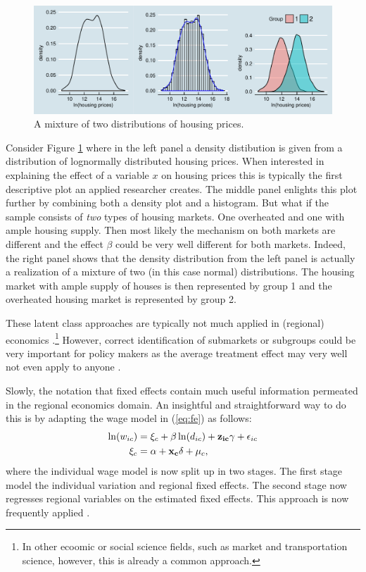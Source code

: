 \documentclass[fleqn,10pt]{SelfArx} %
\begin{document}
\begin{figure}[t!]\centering 
		\includegraphics[width=\textwidth]{./figures/mixture}
	\caption{A mixture of two distributions of housing prices.}
	\label{fig:mixturetwocultures}
\end{figure}

Consider Figure \ref{fig:mixturetwocultures} where in the left panel a density
distibution is given from a distribution of lognormally distributed housing
prices. When interested in explaining the effect of a variable $x$ on housing prices
this is typically the first descriptive plot an applied researcher creates. The
middle panel enlights this plot further by combining both a density plot and a
histogram. But what if the sample consists of \emph{two} types of housing
markets. One overheated and one with ample housing supply. Then most likely the
mechanism on both markets are different and the effect $\beta$ could be very
well different for both markets. Indeed, the right panel shows that the density
distribution from the left panel is actually a realization of a mixture of two
(in this case normal) distributions. The housing market with ample supply of
houses is then represented by group 1 and the overheated housing market is
represented by group 2.

These latent class approaches are typically not much applied in (regional)
economics \citep[see for an exception, e.g.,]{lankhuizen2015}.\footnote{In other
ecoomic or social science fields, such as market and transportation science,
however, this is already a common approach.} However, correct identification of
submarkets or subgroups could be very important for policy makers as the average
treatment effect may very well not even apply to anyone \citep[an argument, in
Dutch, made as well in][]{DeGraaff2014misc}.  

Slowly, the notation that fixed effects contain much useful information
permeated in the regional economics domain. An insightful and straightforward
way to do this is by adapting the wage model in (\ref{eq:fe}) as follows:
\begin{align}
  \label{eq:fe2}
  \ln(w_{ic}) &= \xi_c + \beta \ln(d_{ic})+\mathbf{z_{ic}}\gamma + \epsilon_{ic} \notag \\
  \xi_c&=\alpha + \mathbf{x_c}\delta + \mu_c,
\end{align}
where the individual wage model is now split up in two stages. The first stage
model the individual variation and regional fixed effects. The second stage now
regresses regional variables on the estimated fixed effects. This approach is
now frequently applied \citep[For example, in the so-called sorting
model][]{Bayer2004, Bayer2007a, Wang2016,
  Bernasco2016}. 
\end{document}

